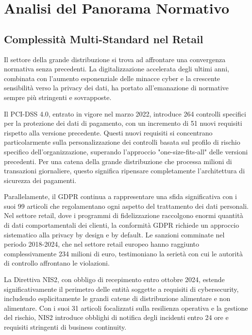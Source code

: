 \section{Analisi del Panorama Normativo}
\label{sec:4.2_panorama}

\subsection{Complessità Multi-Standard nel Retail}
\label{subsec:4.2.1_complessita}

Il settore della grande distribuzione si trova ad affrontare una convergenza normativa senza precedenti. La digitalizzazione accelerata degli ultimi anni, combinata con l'aumento esponenziale delle minacce cyber e la crescente sensibilità verso la privacy dei dati, ha portato all'emanazione di normative sempre più stringenti e sovrapposte.

Il PCI-DSS 4.0, entrato in vigore nel marzo 2022, introduce 264 controlli specifici per la protezione dei dati di pagamento, con un incremento di 51 nuovi requisiti rispetto alla versione precedente\autocite{pcidss2024}. Questi nuovi requisiti si concentrano particolarmente sulla personalizzazione dei controlli basata sul profilo di rischio specifico dell'organizzazione, superando l'approccio "one-size-fits-all" delle versioni precedenti. Per una catena della grande distribuzione che processa milioni di transazioni giornaliere, questo significa ripensare completamente l'architettura di sicurezza dei pagamenti.

Parallelamente, il GDPR continua a rappresentare una sfida significativa con i suoi 99 articoli che regolamentano ogni aspetto del trattamento dei dati personali\autocite{eugdpr2016}. Nel settore retail, dove i programmi di fidelizzazione raccolgono enormi quantità di dati comportamentali dei clienti, la conformità GDPR richiede un approccio sistematico alla privacy by design e by default. Le sanzioni comminate nel periodo 2018-2024, che nel settore retail europeo hanno raggiunto complessivamente 234 milioni di euro\autocite{EDPB2024}, testimoniano la serietà con cui le autorità di controllo affrontano le violazioni.

La Direttiva NIS2, con obbligo di recepimento entro ottobre 2024, estende significativamente il perimetro delle entità soggette a requisiti di cybersecurity, includendo esplicitamente le grandi catene di distribuzione alimentare e non alimentare\autocite{eunis2directive}. Con i suoi 31 articoli focalizzati sulla resilienza operativa e la gestione del rischio, NIS2 introduce obblighi di notifica degli incidenti entro 24 ore e requisiti stringenti di business continuity.

